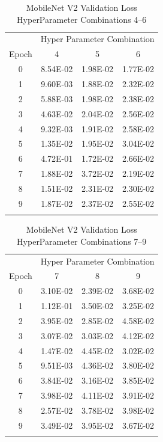 \documentclass[10pt, conference]{IEEEtran}
\begin{document}
\begin{table}[H]
    \centering
    \begin{tabular}{@{}cccc@{}}
        \toprule
        & \multicolumn{3}{c}{Hyper Parameter Combination} \\
        \cmidrule{2-4}
            Epoch  & 4 & 5 & 6\\
        \midrule

        0 & 8.54E-02 & 1.98E-02 & 1.77E-02 \\
        1 & 9.60E-03 & 1.88E-02 & 2.32E-02 \\
        2 & 5.88E-03 & 1.98E-02 & 2.38E-02 \\
        3 & 4.63E-02 & 2.04E-02 & 2.56E-02 \\
        4 & 9.32E-03 & 1.91E-02 & 2.58E-02 \\
        5 & 1.35E-02 & 1.95E-02 & 3.04E-02 \\
        6 & 4.72E-01 & 1.72E-02 & 2.66E-02 \\
        7 & 1.88E-02 & 3.72E-02 & 2.19E-02 \\
        8 & 1.51E-02 & 2.31E-02 & 2.30E-02 \\
        9 & 1.87E-02 & 2.37E-02 & 2.55E-02 \\

        \bottomrule\smallskip
    \end{tabular}
    \caption{MobileNet V2 Validation Loss HyperParameter Combinations 4--6}%
    \label{table:MobileNetV2ValidationLoss4-6}
\end{table}


\begin{table}[H]
    \centering
    \begin{tabular}{@{}cccc@{}}
        \toprule
        & \multicolumn{3}{c}{Hyper Parameter Combination} \\
        \cmidrule{2-4}
            Epoch  & 7 & 8 & 9\\
        \midrule

        0 & 3.10E-02 & 2.39E-02 & 3.68E-02 \\
        1 & 1.12E-01 & 3.50E-02 & 3.25E-02 \\
        2 & 3.95E-02 & 2.85E-02 & 4.58E-02 \\
        3 & 3.07E-02 & 3.03E-02 & 4.12E-02 \\
        4 & 1.47E-02 & 4.45E-02 & 3.02E-02 \\
        5 & 9.51E-03 & 4.36E-02 & 3.80E-02 \\
        6 & 3.84E-02 & 3.16E-02 & 3.85E-02 \\
        7 & 3.98E-02 & 4.11E-02 & 3.91E-02 \\
        8 & 2.57E-02 & 3.78E-02 & 3.98E-02 \\
        9 & 3.49E-02 & 3.95E-02 & 3.67E-02 \\

        \bottomrule\smallskip
    \end{tabular}
    \caption{MobileNet V2 Validation Loss HyperParameter Combinations 7--9}%
    \label{table:MobileNetV2ValidationLoss7-9}
\end{table}
\end{document}
